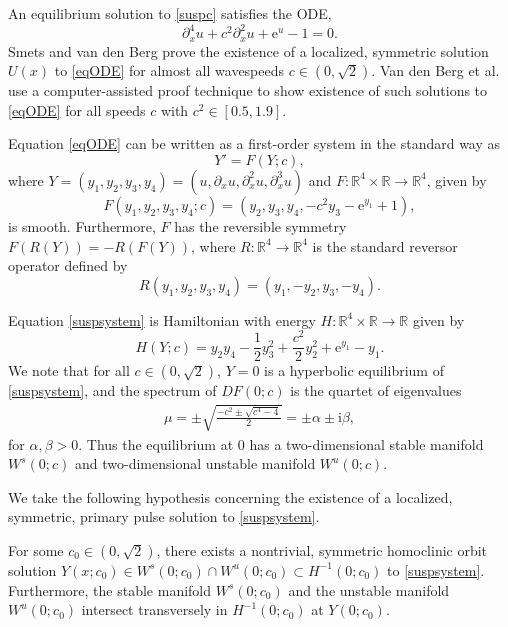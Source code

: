 \documentclass[review,onefignum,onetabnum]{siamart171218}
\newcommand{\R}{\mathbb{R}}
\newcommand{\rme}{\mathrm{e}}
\newcommand{\rmi}{\mathrm{i}}
\begin{document}
An equilibrium solution to \cref{suspc} satisfies the ODE,
\begin{equation}\label{eqODE}
\partial_x^4u +  c^2\partial_x^2u + \rme^{u} - 1 = 0.
\end{equation}
Smets and van den Berg \cite[Theorem 11]{Smets2002} prove the existence of a localized, symmetric solution $U(x)$ to \cref{eqODE} for almost all wavespeeds $c \in (0, \sqrt{2})$. Van den Berg et al. \cite[Theorem~1]{Berg2018} use a computer-assisted proof technique to show existence of such solutions to \cref{eqODE} for all speeds $c$ with $c^2 \in [0.5, 1.9]$. 

Equation \cref{eqODE} can be written as a first-order system in the standard way as 
\begin{equation}\label{suspsystem}
Y' = F(Y; c),
\end{equation}
where $Y = (y_1, y_2, y_3, y_4) = (u, \partial_x u, \partial_x^2 u, \partial_x^3 u)$ and $F: \R^4 \times \R \rightarrow \R^4$, given by
\begin{equation}\label{suspF}
F(y_1, y_2, y_3, y_4; c) = (y_2, y_3, y_4, -c^2 y_3 - \rme^{y_1} + 1),
\end{equation}
is smooth. Furthermore, $F$ has the reversible symmetry $F(R(Y)) = -R(F(Y))$, where $R: \R^4 \rightarrow \R^4$ is the standard reversor operator defined by
\[
R(y_1, y_2, y_3, y_4) = (y_1, -y_2, y_3, -y_4).
\]

Equation \cref{suspsystem} is Hamiltonian with energy $H:\R^4 \times \R \rightarrow \R$ given by
\begin{equation}\label{suspH}
H(Y; c) = y_2 y_4 - \frac{1}{2}y_3^2 + \frac{c^2}{2}y_2^2 + \rme^{y_1} - y_1.
\end{equation}
We note that for all $c \in (0, \sqrt{2})$, $Y = 0$ is a hyperbolic equilibrium of \cref{suspsystem}, and the spectrum of $DF(0; c)$ is the quartet of eigenvalues
\begin{align}\label{specA00}
\mu = \pm \sqrt{\frac{-c^2 \pm \sqrt{c^4 - 4}}{2} } = \pm \alpha \pm \rmi\beta,
\end{align}
for $\alpha, \beta > 0$. Thus the equilibrium at 0 has a two-dimensional stable manifold $W^s(0; c)$ and two-dimensional unstable manifold $W^u(0; c)$.

We take the following hypothesis concerning the existence of a localized, symmetric, primary pulse solution to \cref{suspsystem}.
\begin{hypothesis}\label{Uexistshyp}
For some $c_0 \in (0, \sqrt{2})$, there exists a nontrivial, symmetric homoclinic orbit solution $Y(x; c_0) \in W^s(0; c_0) \cap W^u(0; c_0) \subset H^{-1}(0; c_0)$ to \cref{suspsystem}. Furthermore, the stable manifold $W^s(0; c_0)$ and the unstable manifold $W^u(0; c_0)$ intersect transversely in $H^{-1}(0; c_0)$ at $Y(0; c_0)$.
\end{hypothesis}
\end{document}
